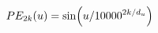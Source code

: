 \documentclass[preview]{standalone}
\begin{document}
\begin{align*}
\special{dvisvgm:raw <g id='unique000'>}PE_{2k}(u)=\sin\!\left(u/10000^{2k/d_u}\right)\special{dvisvgm:raw </g>}
\end{align*}
\end{document}
